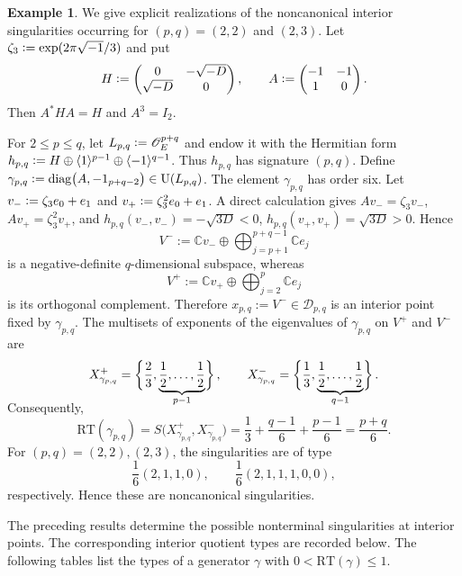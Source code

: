 \documentclass[11pt]{amsart}
\theoremstyle{plain}
\theoremstyle{definition}
\newtheorem{ex}[thm]{Example}
\numberwithin{equation}{section}
\def\diag{\mathop{\mathrm{diag}}\nolimits}
\def\OO{\mathscr{O}}
\def\exp{\mathop{\mathrm{exp}}\nolimits}
\def\U{\mathrm{U}}
\newcommand{\bbC}{\mathbb{C}}
\newcommand{\defeq}{\vcentcolon=}
\begin{document}
\begin{ex}\label{ex:exceptional-interior}
We give explicit realizations of the noncanonical interior
singularities occurring for $(p,q)=(2,2)$ and $(2,3)$.
Let $\zeta_3\defeq\exp(2\pi\sqrt{-1}/3)$
and put
\[
H\defeq
\begin{pmatrix}
0&-\sqrt{-D}\\
\sqrt{-D}&0
\end{pmatrix},
\qquad
A\defeq
\begin{pmatrix}
-1&-1\\
1&0
\end{pmatrix}.
\]
Then $A^*HA=H$ and $A^3=I_2$.

For $2\leq p\leq q$, let $L_{p,q}\defeq\OO_E^{p+q}$
and endow it with the Hermitian form $h_{p,q}
\defeq
H
\oplus
\langle 1\rangle^{p-1}
\oplus
\langle -1\rangle^{q-1}$.
Thus $h_{p,q}$ has signature $(p,q)$. Define $\gamma_{p,q}
\defeq
\diag\bigl(A,-1_{p+q-2}\bigr)
\in \U(L_{p,q})$.
The element $\gamma_{p,q}$ has order six.
Let $v_-\defeq\zeta_3e_0+e_1$ and $v_+\defeq\zeta_3^2e_0+e_1$.
A direct calculation gives $Av_-=\zeta_3v_-$, $
Av_+=\zeta_3^2v_+$,
and $h_{p,q}(v_-,v_-)=-\sqrt{3D}<0$, $h_{p,q}(v_+,v_+)=\sqrt{3D}>0$.
Hence
\[
V^-:=
\bbC v_-
\oplus
\bigoplus_{j=p+1}^{p+q-1}\bbC e_j
\]
is a negative-definite $q$-dimensional subspace, whereas
\[
V^+:=
\bbC v_+
\oplus
\bigoplus_{j=2}^{p}\bbC e_j
\]
is its 
orthogonal complement.
Therefore $x_{p,q}:=V^-\in\mathcal D_{p,q}$
is an interior point fixed by $\gamma_{p,q}$.
The multisets of exponents of the eigenvalues of $\gamma_{p,q}$
on $V^+$ and $V^-$ are
\[
X^+_{\gamma_{p,q}}
=
\left\{
\frac23,
\smash{\underbrace{\frac12,\ldots,\frac12}_{p-1}}
\right\},
\qquad
X^-_{\gamma_{p,q}}
=
\left\{
\frac13,
\smash{\underbrace{\frac12,\ldots,\frac12}_{q-1}}
\right\}.
\]
Consequently,
\[
\mathrm{RT}(\gamma_{p,q})
=
S\bigl(
X^+_{\gamma_{p,q}},
X^-_{\gamma_{p,q}}
\bigr)=
\frac13
+\frac{q-1}{6}
+\frac{p-1}{6}=
\frac{p+q}{6}.
\]
For $(p,q)=(2,2), (2,3)$, the singularities are of type
\[
\frac{1}{6}(2,1,1,0),\qquad \frac{1}{6}(2,1,1,1,0,0),
\]
respectively.
Hence these are noncanonical singularities.
\end{ex}


The preceding results determine the possible nonterminal singularities at interior points.
The corresponding interior quotient types are recorded below.
The following tables list the types of 
a
generator $\gamma$ with $0<\mathrm{RT}(\gamma)\leq1$.
\end{document}
